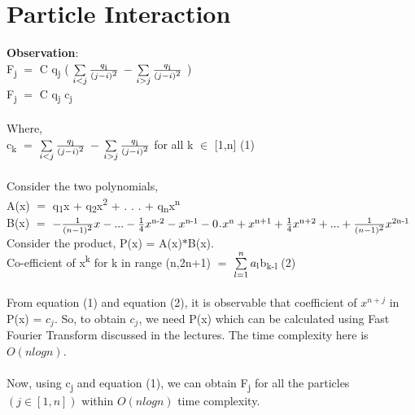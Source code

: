 \documentclass[a4paper]{article}
\begin{document}
\newpage

\section{Particle Interaction}

\textbf{Observation}:\\

F\textsubscript{j} $=$ C q\textsubscript{j} \bigg( $\sum\limits_{i<j}^{}\frac{q\textsubscript{i}}{(j-i)\textsuperscript{2}}$ $-$ $\sum\limits_{i>j}^{}\frac{q\textsubscript{i}}{(j-i)\textsuperscript{2}}$ \bigg)
\\
F\textsubscript{j} $=$ C q\textsubscript{j} c\textsubscript{j}
\\\\

Where, \\
c\textsubscript{k} $=$  $\sum\limits_{i<j}^{}\frac{q\textsubscript{i}}{(j-i)\textsuperscript{2}}$ $-$ $\sum\limits_{i>j}^{}\frac{q\textsubscript{i}}{(j-i)\textsuperscript{2}}$  for all k $\in$ [1,n] \hfill(1)   
\\\\

Consider the two polynomials, \\
A(x) $=$ q\textsubscript{1}x + q\textsubscript{2}x\textsuperscript{2} + . . . + q\textsubscript{n}x\textsuperscript{n}\\

B(x) $=$ $ - \frac{1}{(n-1)\textsuperscript{2}}x -  . . . - \frac{1}{4}x\textsuperscript{n-2} - x\textsuperscript{n-1} - 0$.$x\textsuperscript{n} + x\textsuperscript{n+1} + \frac{1}{4}x\textsuperscript{n+2} + . . . +  \frac{1}{(n-1)\textsuperscript{2}}x\textsuperscript{2n-1} $
\\

Consider the product, P(x) = A(x)$*$B(x). 
\\Co-efficient of x\textsuperscript{k} for k in range (n,2n+1) $=$ $\sum\limits_{l = 1}^n a\textsubscript{l}$b\textsubscript{k-l} \hfill(2)\\\\

From equation (1) and equation (2), it is observable that coefficient of $x^{n+j}$ in P(x) = $c_j$. So, to obtain $c_j$, we need P(x) which can be calculated using Fast Fourier Transform discussed in the lectures. The time complexity here is $O(nlogn)$.
\\\\
Now, using c\textsubscript{j} and equation (1), we can obtain F\textsubscript{j} for all the particles $(j \in [1,n])$ within $O(nlogn)$ time complexity.
\\
\end{document}
